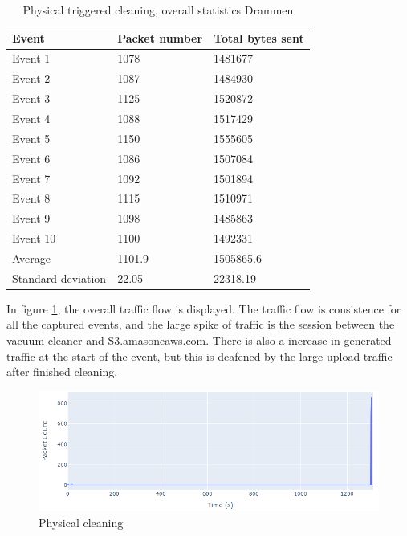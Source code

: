 \begin{table}[H]
\centering
\caption{Physical triggered cleaning, overall statistics Drammen}
\label{tab:PCoverallDRA}
\begin{tabular}{|l|l|l|}
\hline
\textbf{Event} & \textbf{Packet number} & \textbf{Total bytes sent} \\ \hline
Event 1        & 1078                   & 1481677                   \\ \hline
Event 2        & 1087                   & 1484930                   \\ \hline
Event 3        & 1125                   & 1520872                   \\ \hline
Event 4        & 1088                   & 1517429                   \\ \hline
Event 5        & 1150                   & 1555605                   \\ \hline
Event 6        & 1086                   & 1507084                   \\ \hline
Event 7        & 1092                   & 1501894                   \\ \hline
Event 8        & 1115                   & 1510971                   \\ \hline
Event 9        & 1098                   & 1485863                   \\ \hline
Event 10       & 1100                   & 1492331                   \\ \hline
Average        & 1101.9                 & 1505865.6                 \\ \hline
Standard deviation        &22.05
       & 22318.19               \\ \hline
\end{tabular}
\end{table}

In figure \ref{fig:Pc-graph}, the overall traffic flow is displayed. The traffic flow is consistence for all the captured events, and the large spike of traffic is the session between the vacuum cleaner and S3.amasoneaws.com. There is also a increase in generated traffic at the start of the event, but this is 
deafened by the large upload traffic after finished cleaning.
\begin{figure}[H]
    \centering
    \includegraphics[width=\textwidth]{figures/PC-graph.png}
    \caption{Physical cleaning}
    \label{fig:Pc-graph}
\end{figure}

